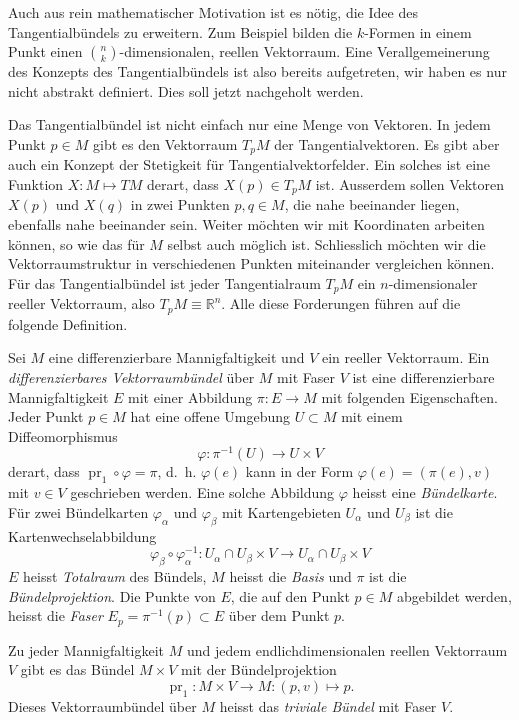 Auch aus rein mathematischer Motivation ist es nötig, die Idee des
Tangentialbündels zu erweitern.
Zum Beispiel bilden die $k$-Formen in einem Punkt einen
$\binom{n}{k}$-dimensionalen, reellen Vektorraum.
Eine Verallgemeinerung des Konzepts des Tangentialbündels ist also
bereits aufgetreten, wir haben es nur nicht abstrakt definiert.
Dies soll jetzt nachgeholt werden.

Das Tangentialbündel ist nicht einfach nur eine Menge von Vektoren.
In jedem Punkt $p\in M$ gibt es den Vektorraum $T_pM$ der Tangentialvektoren.
Es gibt aber auch ein Konzept der Stetigkeit für Tangentialvektorfelder.
Ein solches ist eine Funktion $X\colon M\mapsto TM$ derart, dass 
$X(p)\in T_pM$ ist.
Ausserdem sollen Vektoren $X(p)$ und $X(q)$ in zwei Punkten $p,q\in M$,
die nahe beeinander liegen, ebenfalls nahe beeinander sein.
Weiter möchten wir mit Koordinaten arbeiten können, so wie das für $M$
selbst auch möglich ist.
Schliesslich möchten wir die Vektorraumstruktur in verschiedenen
Punkten miteinander vergleichen können.
Für das Tangentialbündel ist jeder Tangentialraum $T_pM$ ein
$n$-dimensionaler reeller Vektorraum, also $T_pM \equiv \mathbb{R}^n$.
Alle diese Forderungen führen auf die folgende Definition.

\begin{definition}[Vektorraumbündel]
Sei $M$ eine differenzierbare Mannigfaltigkeit und $V$ ein reeller
Vektorraum.
Ein \emph{differenzierbares Vektorraumbündel} über $M$ mit Faser $V$
ist eine differenzierbare Mannigfaltigkeit $E$ mit einer Abbildung
$\pi\colon E\to M$ mit folgenden Eigenschaften.
Jeder Punkt $p\in M$ hat eine offene Umgebung $U\subset M$ mit einem
Diffeomorphismus
\[
\varphi\colon \pi^{-1}(U) \to U \times V
\]
derart, dass $\operatorname{pr}_1\circ\varphi =\pi$, d.~h.
$\varphi(e)$ kann in der Form $\varphi(e) = (\pi(e), v)$ mit $v\in V$
geschrieben werden.
Eine solche Abbildung $\varphi$ heisst eine \emph{Bündelkarte}.
Für zwei Bündelkarten $\varphi_\alpha$ und $\varphi_\beta$ mit
Kartengebieten $U_\alpha$ und $U_\beta$ ist die Kartenwechselabbildung
\[
\varphi_\beta
\circ
\varphi_\alpha^{-1}
\colon
U_\alpha\cap U_\beta \times V
\to
U_\alpha\cap U_\beta \times V
\]
$E$ heisst \emph{Totalraum} des Bündels, $M$ heisst die \emph{Basis}
und $\pi$ ist die \emph{Bündelprojektion}.
Die Punkte von $E$, die auf den Punkt $p\in M$ abgebildet werden,
heisst die \emph{Faser} $E_p=\pi^{-1}(p)\subset E$ über dem Punkt $p$.
\end{definition}

\begin{beispiel}
Zu jeder Mannigfaltigkeit $M$ und jedem endlichdimensionalen
reellen Vektorraum $V$ gibt es das Bündel $M\times V$ mit
der Bündelprojektion
\[
\operatorname{pr}_1
\colon
M\times V \to M
:
(p,v) \mapsto p.
\]
Dieses Vektorraumbündel über $M$ heisst das \emph{triviale Bündel}
mit Faser $V$.
\end{beispiel}

